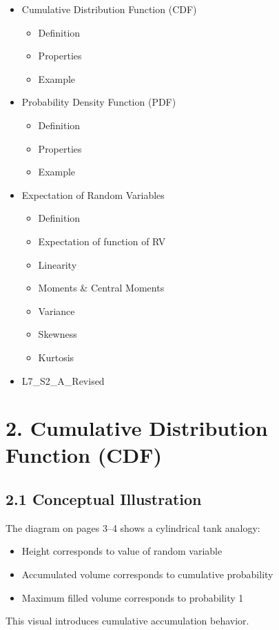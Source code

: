 \documentclass[11pt]{article}
\begin{document}
\begin{itemize}
\item Cumulative Distribution Function (CDF)
\begin{itemize}
\item Definition
\item Properties
\item Example
\end{itemize}
\item Probability Density Function (PDF)
\begin{itemize}
\item Definition
\item Properties
\item Example
\end{itemize}
\item Expectation of Random Variables
\begin{itemize}
\item Definition
\item Expectation of function of RV
\item Linearity
\item Moments \& Central Moments
\item Variance
\item Skewness
\item Kurtosis
\end{itemize}
\item L7\_S2\_A\_Revised
\end{itemize}

\section*{2. Cumulative Distribution Function (CDF)}

\subsection*{2.1 Conceptual Illustration}

The diagram on pages 3–4 shows a cylindrical tank analogy:

\begin{itemize}
\item Height corresponds to value of random variable
\item Accumulated volume corresponds to cumulative probability
\item Maximum filled volume corresponds to probability 1
\end{itemize}

This visual introduces cumulative accumulation behavior.
\end{document}
